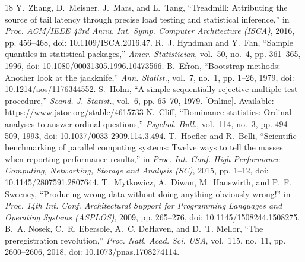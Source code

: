 \documentclass[conference,a4paper]{IEEEtran}
\begin{document}
\begin{thebibliography}{18}
 Y.~Zhang, D.~Meisner, J.~Mars, and L.~Tang, ``Treadmill: Attributing the source of tail latency through precise load testing and statistical inference,'' in \emph{Proc. ACM/IEEE 43rd Annu. Int. Symp. Computer Architecture (ISCA)}, 2016, pp. 456--468, doi: 10.1109/ISCA.2016.47.
 R.~J. Hyndman and Y.~Fan, ``Sample quantiles in statistical packages,'' \emph{Amer. Statistician}, vol.~50, no.~4, pp. 361--365, 1996, doi: 10.1080/00031305.1996.10473566.
 B.~Efron, ``Bootstrap methods: Another look at the jackknife,'' \emph{Ann. Statist.}, vol.~7, no.~1, pp. 1--26, 1979, doi: 10.1214/aos/1176344552.
 S.~Holm, ``A simple sequentially rejective multiple test procedure,'' \emph{Scand. J. Statist.}, vol.~6, pp. 65--70, 1979. [Online]. Available: \url{https://www.jstor.org/stable/4615733}
 N.~Cliff, ``Dominance statistics: Ordinal analyses to answer ordinal questions,'' \emph{Psychol. Bull.}, vol.~114, no.~3, pp. 494--509, 1993, doi: 10.1037/0033-2909.114.3.494.
 T.~Hoefler and R.~Belli, ``Scientific benchmarking of parallel computing systems: Twelve ways to tell the masses when reporting performance results,'' in \emph{Proc. Int. Conf. High Performance Computing, Networking, Storage and Analysis (SC)}, 2015, pp. 1--12, doi: 10.1145/2807591.2807644.
 T.~Mytkowicz, A.~Diwan, M.~Hauswirth, and P.~F. Sweeney, ``Producing wrong data without doing anything obviously wrong!'' in \emph{Proc. 14th Int. Conf. Architectural Support for Programming Languages and Operating Systems (ASPLOS)}, 2009, pp. 265--276, doi: 10.1145/1508244.1508275.
 B.~A. Nosek, C.~R. Ebersole, A.~C. DeHaven, and D.~T. Mellor, ``The preregistration revolution,'' \emph{Proc. Natl. Acad. Sci. USA}, vol.~115, no.~11, pp. 2600--2606, 2018, doi: 10.1073/pnas.1708274114.
\end{thebibliography}
\end{document}

